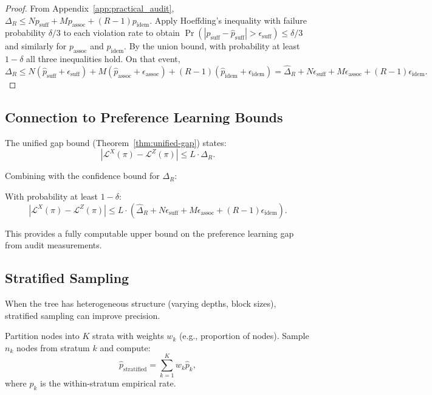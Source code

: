 \begin{proof}
From Appendix~\ref{app:practical_audit},
$
\Delta_R \le N p_{\text{suff}} + M p_{\text{assoc}} + (R-1) p_{\text{idem}}.
$
Apply Hoeffding's inequality with failure probability $\delta/3$ to each violation rate to obtain
$
\Pr(|p_{\text{suff}}-\hat p_{\text{suff}}|>\epsilon_{\text{suff}})\le \delta/3
$
and similarly for $p_{\text{assoc}}$ and $p_{\text{idem}}$. By the union bound, with probability at least $1-\delta$ all three inequalities hold. On that event,
\[
\Delta_R \le N (\hat{p}_{\text{suff}} + \epsilon_{\text{suff}})
      + M (\hat{p}_{\text{assoc}} + \epsilon_{\text{assoc}})
      + (R-1) (\hat{p}_{\text{idem}} + \epsilon_{\text{idem}})
 = \hat{\Delta}_R + N \epsilon_{\text{suff}} + M \epsilon_{\text{assoc}} + (R-1) \epsilon_{\text{idem}}.
\]
\end{proof}

\subsection{Connection to Preference Learning Bounds}

The unified gap bound (Theorem~\ref{thm:unified-gap}) states:
\[
|\mathcal{L}^X(\pi) - \mathcal{L}^Z(\pi)| \le L \cdot \Delta_R.
\]

Combining with the confidence bound for $\Delta_R$:

\begin{corollary}
With probability at least $1-\delta$:
\[
|\mathcal{L}^X(\pi) - \mathcal{L}^Z(\pi)| \le L \cdot \left( \hat{\Delta}_R + N \epsilon_{\text{suff}} + M \epsilon_{\text{assoc}} + (R-1) \epsilon_{\text{idem}} \right).
\]
\end{corollary}

This provides a fully computable upper bound on the preference learning gap from audit measurements.

\subsection{Stratified Sampling}

When the tree has heterogeneous structure (varying depths, block sizes), stratified sampling can improve precision.

\begin{definition}
Partition nodes into $K$ strata with weights $w_k$ (e.g., proportion of nodes). Sample $n_k$ nodes from stratum $k$ and compute:
\[
\hat{p}_{\text{stratified}} = \sum_{k=1}^K w_k \hat{p}_k,
\]
where $\hat{p}_k$ is the within-stratum empirical rate.
\end{definition}


